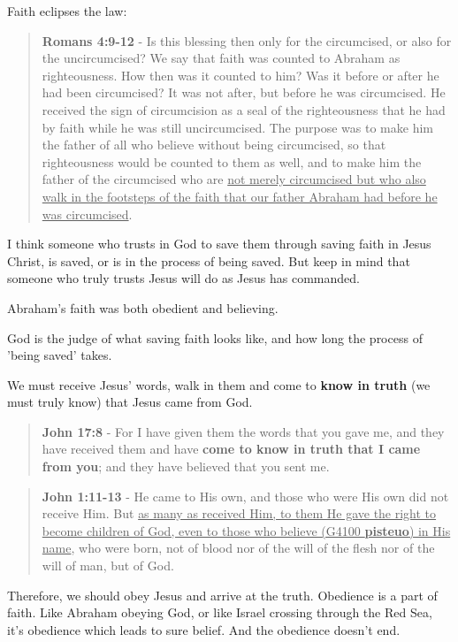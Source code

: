 \documentclass[11pt]{article}
\begin{document}
Faith eclipses the law:

\begin{quote}
\textbf{Romans 4:9-12} - Is this blessing then only for the circumcised, or also for the uncircumcised? We say that faith was counted to Abraham as righteousness. How then was it counted to him? Was it before or after he had been circumcised? It was not after, but before he was circumcised. He received the sign of circumcision as a seal of the righteousness that he had by faith while he was still uncircumcised. The purpose was to make him the father of all who believe without being circumcised, so that righteousness would be counted to them as well, and to make him the father of the circumcised who are \uline{not merely circumcised but who also walk in the footsteps of the faith that our father Abraham had before he was circumcised}.
\end{quote}

I think someone who trusts in God to save them through saving faith in Jesus Christ, is saved, or is in the process of being saved.
But keep in mind that someone who truly trusts Jesus will do as Jesus has commanded.

Abraham's faith was both obedient and believing.

God is the judge of what saving faith looks like, and how long the process of 'being saved' takes.

We must receive Jesus' words, walk in them and come to \textbf{know in truth} (we must truly know) that Jesus came from God.

\begin{quote}
\textbf{John 17:8} - For I have given them the words that you gave me, and they have received them and have \textbf{come to know in truth that I came from you}; and they have believed that you sent me.
\end{quote}

\begin{quote}
\textbf{John 1:11-13} - He came to His own, and those who were His own did not receive Him. But \uline{as many as received Him, to them He gave the right to become children of God, even to those who believe (G4100 \textbf{pisteuo}) in His name}, who were born, not of blood nor of the will of the flesh nor of the will of man, but of God.
\end{quote}

Therefore, we should obey Jesus and arrive at the truth. Obedience is a part of faith. Like Abraham obeying God, or like Israel crossing through the Red Sea, it's obedience which leads to sure belief.
And the obedience doesn't end.
\end{document}
